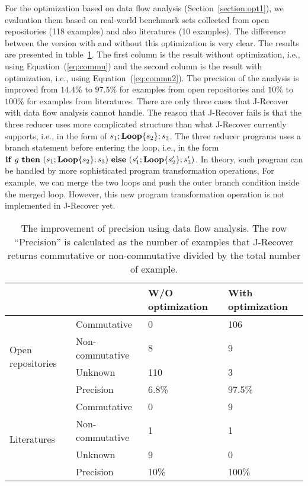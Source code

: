 \documentclass{llncs}
\newcommand{\ite}[3]{
	 \ifmmode
	 \mathbf{if}\ #1 \ \mathbf{then}\ #2\  \mathbf{else}\ #3
	 \else
	 \textbf{if}\ #1 \ \textbf{then}\ #2\  \textbf{else}\ #3
	 \fi}
\newcommand{\rloop}{
	\ifmmode
	\mathbf{Loop}
	\else
	\textbf{Loop}
	\fi}
\begin{document}
For the optimization based on data flow analysis (Section~\ref{section:opt1}), we evaluation them based on real-world benchmark sets collected from open repositories (118 examples) and also literatures (10 examples). The difference between the version with and without this optimization is very clear. The results are presented in table~\ref{tab:opt1}. The first column is the result without optimization, i.e., using Equation~(\ref{eq:commu}) and the second column is the result with optimization, i.e., using Equation~(\ref{eq:commu2}). The precision of the analysis is improved from $14.4\%$ to $97.5\%$ for examples from open repositories and
$10\%$ to $100\%$ for examples from literatures. There are only three cases that J-Recover with data flow analysis cannot handle. The reason that J-Recover fails is that the three reducer uses more complicated structure than what J-Recover currently supports, i.e., in the form of $s_1;\rloop\{s_2\};s_3$. The three reducer programs uses a branch statement before entering the loop, i.e., in the form $\ite{g}{(s_1;\rloop\{s_2\};s_3)}{(s'_1;\rloop\{s'_2\};s'_3)}$. In theory, such program can be handled by more sophisticated program transformation operations, For example, we can merge the two loops and push the outer branch condition inside the merged loop.
However, this new program transformation operation is not implemented in J-Recover yet.

\begin{table}[htb]
	\centering
	\begin{tabular}{|l|l|l|l|}
		\hline
		& &W/O optimization	& With optimization\\
		\hline
		\hline
		\multirow{4}{*}{Open repositories}&Commutative& 0&106\\
		\cline{2-4}
		&Non-commutative&8&9\\
		\cline{2-4}
		&Unknown&110&3\\
		\cline{2-4}
		&Precision& 6.8\% & 97.5\%\\
		\hline
		\hline
		\multirow{4}{*}{Literatures}&Commutative& 0&9\\
		\cline{2-4}
		&Non-commutative&1&1\\
		\cline{2-4}
		&Unknown&9&0\\
		\cline{2-4}
		&Precision& 10\% & 100\%\\
		\hline
	\end{tabular}
	\caption{The improvement of precision using data flow analysis. The row ``Precision'' is calculated as the number of examples that J-Recover returns commutative or non-commutative divided by the total number of example.}
	\label{tab:opt1}
\end{table}
\end{document}
